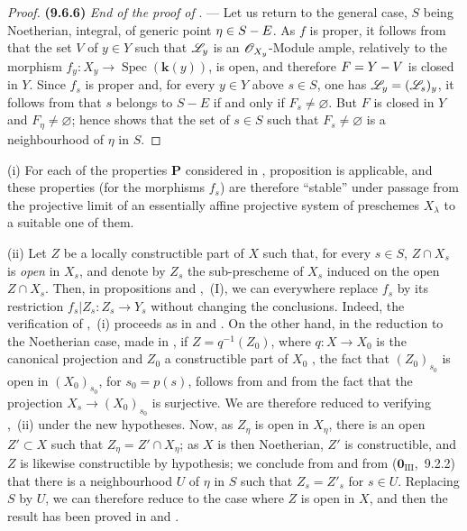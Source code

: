 \begin{proof}
%
\textbf{(9.6.6)} \emph{End of the proof of} . ---
Let us return to the general case, $S$ being Noetherian, integral, of generic point $\eta\in S- E$.
As $f$ is proper, it follows from  that the set $V$ of $y\in Y$ such that $\mathscr{L}_y$ is an $\mathscr{O}_{X_y}$-Module ample, relatively to the morphism $f_y:X_y\to\operatorname{Spec}(\boldsymbol{k}(y))$, is open, and therefore $F=Y- V$ is closed in $Y$.
Since $f_s$ is proper and, for every $y\in Y$ above $s\in S$, one has
$\mathscr{L}_y=(\mathscr{L}_s)_y$, it follows from  that $s$ belongs to
$S-E$ if and only if $F_s\neq\varnothing$.
But $F$ is closed in $Y$ and $F_\eta\neq\varnothing$; hence  shows
that the set of $s\in S$ such that $F_s\neq\varnothing$ is a neighbourhood of
$\eta$ in $S$.
\end{proof}

\begin{remarks}[9.6.7]
\label{IV.9.6.7}
(i) For each of the properties $\boldsymbol{P}$ considered in , proposition  is applicable, and these properties (for the morphisms $f_s$) are therefore ``stable'' under passage from the projective limit of an essentially affine projective system  of preschemes $X_\lambda$ to a suitable one of them.

(ii) Let $Z$ be a locally constructible part of $X$ such that, for every $s\in S$, $Z\cap X_s$ is \emph{open} in $X_s$, and denote by $Z_s$ the sub-prescheme of $X_s$ induced on the open $Z\cap X_s$.
Then, in propositions  and ,~(I), we can everywhere replace $f_s$ by its restriction $f_s|Z_s:Z_s\to Y_s$ without changing the conclusions.
Indeed, the verification of ,~(i) proceeds as in  and .
On the other hand, in the reduction to the Noetherian case, made in , if $Z=q^{-1}(Z_0)$, where $q:X\to X_0$ is the canonical projection and $Z_0$ a constructible part of $X_0$ , the fact that $(Z_0)_{s_0}$ is open in $(X_0)_{s_0}$, for $s_0=p(s)$, follows from  and from the fact that the projection $X_s\to(X_0)_{s_0}$ is surjective.
We are therefore reduced to verifying ,~(ii) under the new hypotheses.
Now, as $Z_\eta$ is open in $X_\eta$, there is an open $Z'\subset X$ such that $Z_\eta=Z'\cap X_\eta$; as $X$ is then Noetherian, $Z'$ is constructible, and $Z$ is likewise constructible by hypothesis; we conclude from  and from ($\mathbf{0}_{\mathrm{III}}$,~9.2.2) that there is a neighbourhood $U$ of $\eta$ in $S$ such that $Z_s=Z'_s$ for $s\in U$.
Replacing $S$ by $U$, we can therefore reduce to the case where $Z$ is open in $X$, and then the result has been proved in  and .
\end{remarks}

